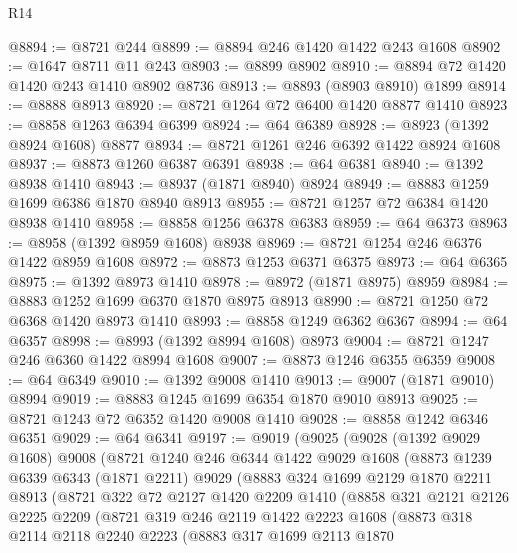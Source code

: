 \begin{lexlean}{R14}
\begin{coremodule}
@8894 := @8721 @244
@8899 := @8894 @246 @1420 @1422 @243 @1608
@8902 := @1647 @8711 @11 @243
@8903 := @8899 @8902
@8910 := @8894 @72 @1420 @1420 @243 @1410 @8902 @8736
@8913 := @8893 (@8903 @8910) @1899
@8914 := @8888 @8913
@8920 := @8721 @1264 @72 @6400 @1420 @8877 @1410
@8923 := @8858 @1263 @6394 @6399
@8924 := @64 @6389
@8928 := @8923 (@1392 @8924 @1608) @8877
@8934 := @8721 @1261 @246 @6392 @1422 @8924 @1608
@8937 := @8873 @1260 @6387 @6391
@8938 := @64 @6381
@8940 := @1392 @8938 @1410
@8943 := @8937 (@1871 @8940) @8924
@8949 := @8883 @1259 @1699 @6386 @1870 @8940 @8913
@8955 := @8721 @1257 @72 @6384 @1420 @8938 @1410
@8958 := @8858 @1256 @6378 @6383
@8959 := @64 @6373
@8963 := @8958 (@1392 @8959 @1608) @8938
@8969 := @8721 @1254 @246 @6376 @1422 @8959 @1608
@8972 := @8873 @1253 @6371 @6375
@8973 := @64 @6365
@8975 := @1392 @8973 @1410
@8978 := @8972 (@1871 @8975) @8959
@8984 := @8883 @1252 @1699 @6370 @1870 @8975 @8913
@8990 := @8721 @1250 @72 @6368 @1420 @8973 @1410
@8993 := @8858 @1249 @6362 @6367
@8994 := @64 @6357
@8998 := @8993 (@1392 @8994 @1608) @8973
@9004 := @8721 @1247 @246 @6360 @1422 @8994 @1608
@9007 := @8873 @1246 @6355 @6359
@9008 := @64 @6349
@9010 := @1392 @9008 @1410
@9013 := @9007 (@1871 @9010) @8994
@9019 := @8883 @1245 @1699 @6354 @1870 @9010 @8913
@9025 := @8721 @1243 @72 @6352 @1420 @9008 @1410
@9028 := @8858 @1242 @6346 @6351
@9029 := @64 @6341
@9197 := @9019
    (@9025
      (@9028
        (@1392 @9029 @1608)
        @9008
        (@8721
          @1240
          @246
          @6344
          @1422
          @9029
          @1608
          (@8873
            @1239
            @6339
            @6343
            (@1871 @2211)
            @9029
            (@8883
              @324
              @1699
              @2129
              @1870
              @2211
              @8913
              (@8721
                @322
                @72
                @2127
                @1420
                @2209
                @1410
                (@8858
                  @321
                  @2121
                  @2126
                  @2225
                  @2209
                  (@8721
                    @319
                    @246
                    @2119
                    @1422
                    @2223
                    @1608
                    (@8873
                      @318
                      @2114
                      @2118
                      @2240
                      @2223
                      (@8883
                        @317
                        @1699
                        @2113
                        @1870

\end{coremodule}
\end{lexlean}
